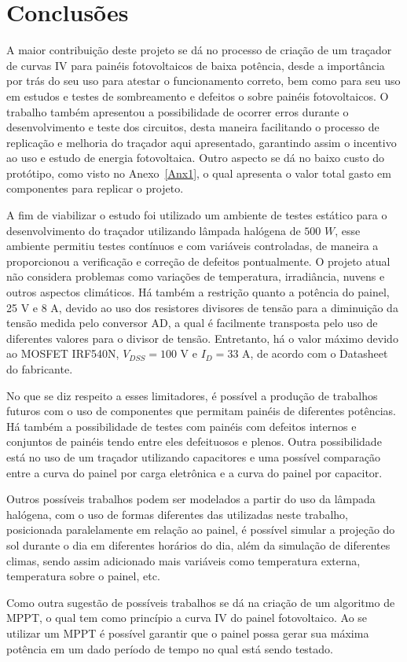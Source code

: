 \chapter{Conclusões}
\label{cap:05}

A maior contribuição deste projeto se dá no processo de criação de um traçador de curvas IV para painéis fotovoltaicos de baixa potência, desde a importância por trás do seu uso para atestar o funcionamento correto, bem como para seu uso em estudos e testes de sombreamento e defeitos o sobre painéis fotovoltaicos. O trabalho também apresentou a possibilidade de ocorrer erros durante o desenvolvimento e teste dos circuitos, desta maneira facilitando o processo de replicação e melhoria do traçador aqui apresentado, garantindo assim o incentivo ao uso e estudo de energia fotovoltaica. Outro aspecto se dá no baixo custo do protótipo, como visto no Anexo~\ref{Anx1}, o qual apresenta o valor total gasto em componentes para replicar o projeto.

A fim de viabilizar o estudo foi utilizado um ambiente de testes estático para o desenvolvimento do traçador utilizando lâmpada halógena de $500$ $W$, esse ambiente permitiu testes contínuos e com variáveis controladas, de maneira a proporcionou a verificação e correção de defeitos pontualmente. O projeto atual não considera problemas como variações de temperatura, irradiância, nuvens e outros aspectos climáticos. Há também a restrição quanto a potência do painel, 25 V e 8 A, devido ao uso dos resistores divisores de tensão para a diminuição da tensão medida pelo conversor AD, a qual é facilmente transposta pelo uso de diferentes valores para o divisor de tensão. Entretanto, há o valor máximo devido ao MOSFET IRF540N, $V_{DSS} = 100$ V e $I_{D} = 33$ A, de acordo com o Datasheet do fabricante.

No que se diz respeito a esses limitadores, é possível a produção de trabalhos futuros com o uso de componentes que permitam painéis de diferentes potências. Há também a possibilidade de testes com painéis com defeitos internos e conjuntos de painéis tendo entre eles defeituosos e plenos. Outra possibilidade está no uso de um traçador utilizando capacitores e uma possível comparação entre a curva do painel por carga eletrônica e a curva do painel por capacitor.

Outros possíveis trabalhos podem ser modelados a partir do uso da lâmpada halógena, com o uso de formas diferentes das utilizadas neste trabalho, posicionada paralelamente em relação ao painel, é possível simular a projeção do sol durante o dia em diferentes horários do dia, além da simulação de diferentes climas, sendo assim adicionado mais variáveis como temperatura externa, temperatura sobre o painel, etc.

Como outra sugestão de possíveis trabalhos se dá na criação de um algoritmo de MPPT, o qual tem como princípio a curva IV do painel fotovoltaico. Ao se utilizar um MPPT é possível garantir que o painel possa gerar sua máxima potência em um dado período de tempo no qual está sendo testado.




